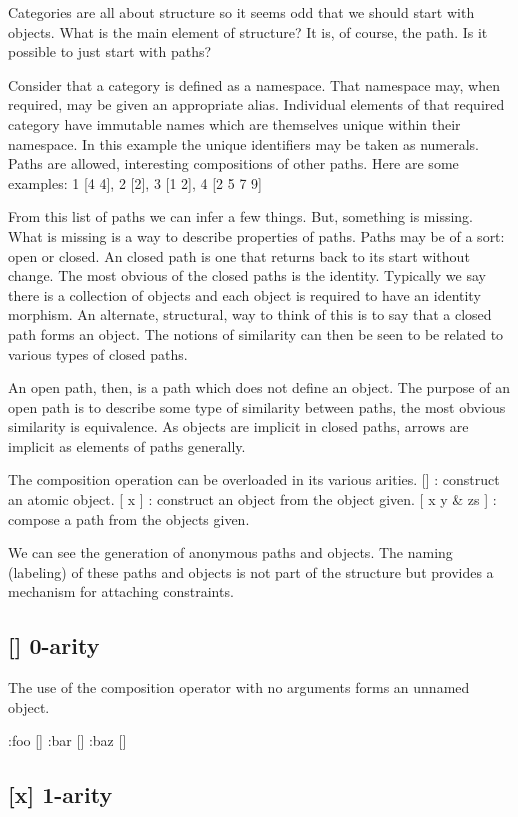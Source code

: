\documentclass{article}
\begin{document}
Categories are all about structure so it seems odd that we should start with objects.
What is the main element of structure?
It is, of course, the path.
Is it possible to just start with paths?

Consider that a category is defined as a namespace.
That namespace may, when required, may be given an appropriate alias.
Individual elements of that required category have immutable names which
are themselves unique within their namespace.
In this example the unique identifiers may be taken as numerals.
Paths are allowed, interesting compositions of other paths.
Here are some examples:
{ 1 [4 4], 2 [2], 3 [1 2], 4 [2 5 7 9] }

From this list of paths we can infer a few things.
But, something is missing.
What is missing is a way to describe properties of paths.
Paths may be of a sort: open or closed.
An closed path is one that returns back to its start without change.
The most obvious of the closed paths is the identity.
Typically we say there is a collection of objects and each object is required
to have an identity morphism.
An alternate, structural, way to think of this is to say
that a closed path forms an object.
The notions of similarity can then be seen to be related to
various types of closed paths.

An open path, then, is a path which does not define an object.
The purpose of an open path is to describe some type of similarity
between paths, the most obvious similarity is equivalence.
As objects are implicit in closed paths, arrows are implicit
as elements of paths generally.

The composition operation can be overloaded in its various arities.
[] : construct an atomic object.
[ x ] : construct an object from the object given.
[ x y & zs ] : compose a path from the objects given.

We can see the generation of anonymous paths and objects.
The naming (labeling) of these paths and objects is not part
of the structure but provides a mechanism for attaching constraints.


\subsection{[] 0-arity}

The use of the composition operator with no arguments forms an unnamed object.

{:foo [] :bar [] :baz []}

\subsection{[x] 1-arity}
\end{document}
